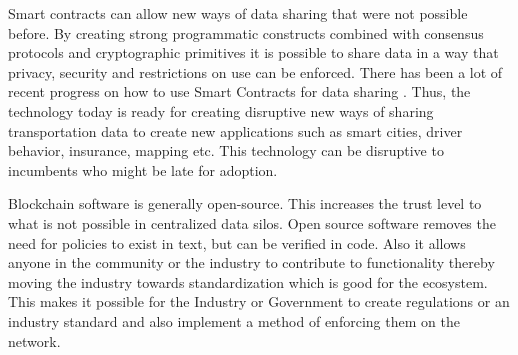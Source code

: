 Smart contracts can allow new ways of data sharing that were not possible before. By creating strong programmatic
constructs combined with consensus protocols and cryptographic primitives it is possible to share data in a way that
privacy, security and restrictions on use can be enforced. There has been a lot of recent progress on how to use Smart
Contracts for data sharing \cite{liu_2018}. Thus, the technology today is ready for creating disruptive new ways of
sharing transportation data to create new applications such as smart cities, driver behavior, insurance, mapping etc.
This technology can be disruptive to incumbents who might be late for adoption.

Blockchain software is generally open-source. This increases the trust level to what is not possible in centralized data
silos.  Open source software removes the need for policies to exist in text, but can be verified in code. Also it allows
anyone in the community or the industry to contribute to functionality thereby moving the industry towards
standardization which is good for the ecosystem. This makes it possible for the Industry or Government to create
regulations or an industry standard and also implement a method of enforcing them on the network.

%
%
%
%
%
%
%
%
